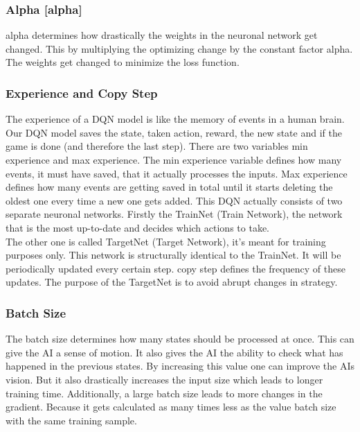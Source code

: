 \documentclass[12pt]{article}
\def\alpha{alpha}%
\def\({}%
\def\){}%
\begin{document}
\subsubsection{Alpha [\(\alpha\)]}\label{sssec:alpha}
\Gls{alpha} determines how drastically the \glspl{weight} in the \gls{neuronal network} get changed. This by multiplying the optimizing change by the constant factor \gls{alpha}. The \glspl{weight} get changed to minimize the loss function.

\subsubsection{Experience and Copy Step}\label{sssec:copy_step}
The \gls{experience} of a \gls{DQN} model is like the \gls{memory} of events in a human brain. Our \gls{DQN} model saves the \gls{state}, taken action, \gls{reward}, the new \gls{state} and if the game is done (and therefore the last step). There are two variables \gls{min experience} and \gls{max experience}. The \gls{min experience} variable defines how many events, it must have saved, that it actually processes the \glspl{input}. Max \gls{experience} defines how many events are getting saved in total until it starts deleting the oldest one every time a new one gets added.
This \gls{DQN} actually consists of two separate \glspl{neuronal network}. Firstly the \gls{TrainNet} (Train Network), the network that is the most up-to-date and decides which actions to take. \\
The other one is called \gls{TargetNet} (Target Network), it’s meant for training purposes only. This network is structurally identical to the \gls{TrainNet}. It will be periodically updated every certain step. \Gls{copy step} defines the frequency of these updates. The purpose of the  \gls{TargetNet} is to avoid abrupt changes in strategy. 

\subsubsection{Batch Size}
The \gls{batch size} determines how many \glspl{state} should be processed at once. This can give the \gls{AI} a sense of motion. It also gives the \gls{AI} the ability to check what has happened in the previous \glspl{state}. By increasing this value one can improve the AIs vision. But it also drastically increases the input size which leads to longer training time. Additionally, a large \gls{batch size} leads to more changes in the gradient. Because it gets calculated as many times less as the value \gls{batch size} with the same training sample. 
\end{document}
